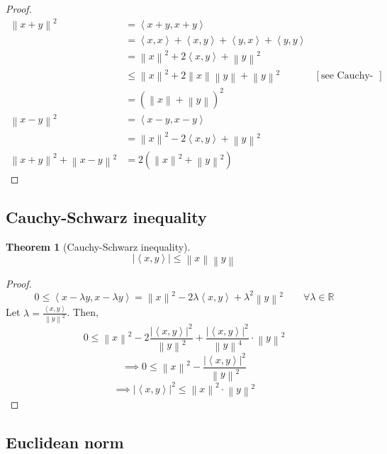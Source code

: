 \documentclass{article}
\newtheorem{theorem}{Theorem}  \numberwithin{theorem}{section}
\newcommand{\angel}[1]{\left\langle#1\right\rangle}
\newcommand{\norm}[1]{\left\|#1\right\|}
\newcommand{\card}[1]{\left|#1\right|}
\begin{document}
\begin{proof}
  \begin{align*}
    \norm{x + y}^2
      &= \angel{x+y, x+y} \\
      &= \angel{x,x} + \angel{x,y} + \angel{y,x} + \angel{y,y} \\
      &= \norm{x}^2 + 2\angel{x,y} + \norm{y}^2 \\
      &\leq \norm{x}^2 + 2 \norm{x} \norm{y} + \norm{y}^2  & [\text{see Cauchy-Schwarz inequality}] \\
      &= (\norm{x} + \norm{y})^2 \\
    \norm{x - y}^2
      &= \angel{x - y, x - y} \\
      &= \norm{x}^2 - 2\angel{x,y} + \norm{y}^2 \\
    \norm{x + y}^2 + \norm{x - y}^2
      &= 2 \left(\norm{x}^2 + \norm{y}^2\right)
  \end{align*}
\end{proof}

\subsection{Cauchy-Schwarz inequality}

\begin{theorem}[Cauchy-Schwarz inequality]
  \[ \card{\angel{x, y}} \leq \norm{x} \norm{y} \]
\end{theorem}
\begin{proof}
  \[ 0 \leq \angel{x - \lambda y, x - \lambda y} = \norm{x}^2 - 2\lambda \angel{x, y} + \lambda^2 \norm{y}^2 \qquad \forall \lambda \in \mathbb R \]
  Let $\lambda = \frac{\angel{x, y}}{\norm{y}^2}$. Then,
  \[ 0 \leq \norm{x}^2 - 2 \frac{\card{\angel{x, y}}^2}{\norm{y}^2} + \frac{\card{\angel{x, y}}^2}{\norm{y}^4} \cdot \norm{y}^2 \]
  \[ \implies 0 \leq \norm{x}^2 - \frac{\card{\angel{x, y}}^2}{\norm{y}^2} \]
  \[ \implies \card{\angel{x, y}}^2 \leq \norm{x}^2 \cdot \norm{y}^2 \]
\end{proof}

\subsection{Euclidean norm}
\end{document}
